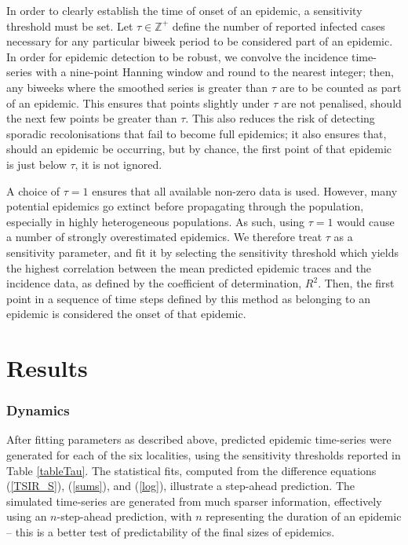 \documentclass[10pt]{article}
\begin{document}
In order to clearly establish the time of onset of an epidemic, a sensitivity threshold must be set. Let $\tau \in \mathbb{Z}^+$ define the number of reported infected cases necessary for any particular biweek period to be considered part of an epidemic. In order for epidemic detection to be robust, we convolve the incidence time-series with a nine-point Hanning window and round to the nearest integer; then, any biweeks where the smoothed series is greater than $\tau$ are to be counted as part of an epidemic. This ensures that points slightly under $\tau$ are not penalised, should the next few points be greater than $\tau$. This also reduces the risk of detecting sporadic recolonisations that fail to become full epidemics; it also ensures that, should an epidemic be occurring, but by chance, the first point of that epidemic is just below $\tau$, it is not ignored. 

A choice of $\tau = 1$ ensures that all available non-zero data is used. However, many potential epidemics go extinct before propagating through the population, especially in highly heterogeneous populations. As such, using $\tau=1$ would cause a number of strongly overestimated epidemics. We therefore treat $\tau$ as a sensitivity parameter, and fit it by selecting the sensitivity threshold which yields the highest correlation between the mean predicted epidemic traces and the incidence data, as defined by the coefficient of determination, $R^2$. Then, the first point in a sequence of time steps defined by this method as belonging to an epidemic is considered the onset of that epidemic.


















\section*{Results}

\subsubsection*{Dynamics}

After fitting parameters as described above, predicted epidemic time-series were generated for each of the six localities, using the sensitivity thresholds reported in Table \ref{tableTau}. The statistical fits, computed from the difference equations (\ref{TSIR_S}), (\ref{sums}), and (\ref{log}), illustrate a step-ahead prediction. The simulated time-series are generated from much sparser information, effectively using an $n$-step-ahead prediction, with $n$ representing the duration of an epidemic -- this is a better test of predictability of the final sizes of epidemics.
\end{document}
